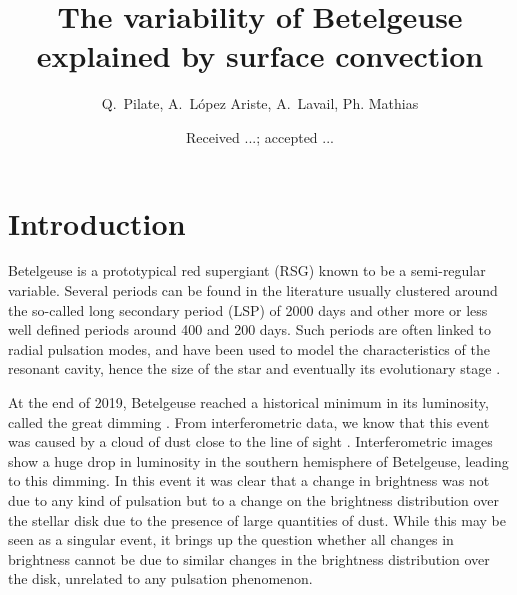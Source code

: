 \documentclass{aa}
\begin{document}
 


   \title{The variability  of Betelgeuse explained by surface convection}


    \author{{ Q.~Pilate},{ A.~L{\'o}pez Ariste},{ A.~Lavail},{ Ph. Mathias} }


   \date{Received ...; accepted ...}

 
  \abstract


   \keywords{
               }

   \maketitle
%

\section{Introduction}

Betelgeuse is a prototypical red supergiant (RSG) known to be a semi-regular variable. Several periods can be found in the 
literature usually clustered around the so-called long secondary period (LSP) of 2000 days and other more or less well defined 
periods around 400 and 200 days. Such periods are often linked to radial pulsation modes,   and have been used to model 
the characteristics of the resonant cavity, hence the size of the star and eventually its evolutionary stage \cite{XXX}.


At the end of 2019, Betelgeuse reached a historical minimum in its luminosity, called the great dimming \citep{guinan_fall_2020}. 
From interferometric data, we know that this event was caused by a cloud of dust close to the line of sight \citep{montarges_dusty_2021}. 
Interferometric images show a huge drop in luminosity in the southern hemisphere of Betelgeuse, leading to this dimming. In this event it was clear that a change in brightness was not due to any kind of pulsation but to a change on the 
brightness distribution over the stellar disk due to the presence of large quantities of dust. While this may be seen as 
a singular event, it brings up the question whether all changes in brightness cannot be due to similar changes in the brightness 
distribution over the disk, unrelated to any pulsation phenomenon. 
\end{document}
